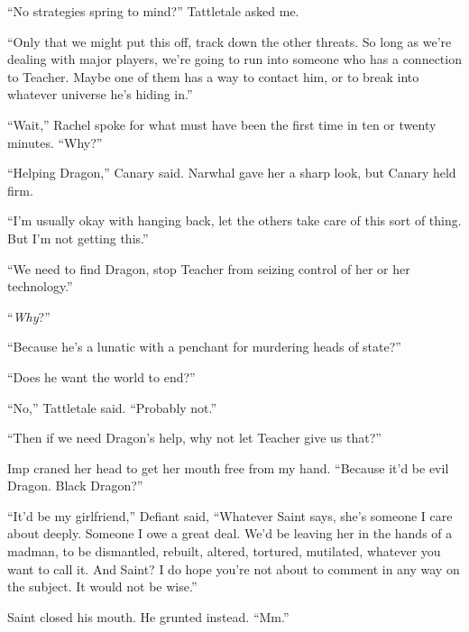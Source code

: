 ``No strategies spring to mind?''  Tattletale asked me.



``Only that we might put this off, track down the other threats.  So long as we're dealing with major players, we're going to run into someone who has a connection to Teacher.  Maybe one of them has a way to contact him, or to break into whatever universe he's hiding in.''



``Wait,'' Rachel spoke for what must have been the first time in ten or twenty minutes.  ``Why?''



``Helping Dragon,'' Canary said.  Narwhal gave her a sharp look, but Canary held firm.



``I'm usually okay with hanging back, let the others take care of this sort of thing.  But I'm not getting this.''



``We need to find Dragon, stop Teacher from seizing control of her or her technology.''



``\emph{Why}?''



``Because he's a lunatic with a penchant for murdering heads of state?''



``Does he want the world to end?''



``No,'' Tattletale said.  ``Probably not.''



``Then if we need Dragon's help, why not let Teacher give us that?''



Imp craned her head to get her mouth free from my hand.  ``Because it'd be evil Dragon.  Black Dragon?''



``It'd be my girlfriend,'' Defiant said, ``Whatever Saint says, she's someone I care about deeply.  Someone I owe a great deal.  We'd be leaving her in the hands of a madman, to be dismantled, rebuilt, altered, tortured, mutilated, whatever you want to call it.  And Saint?  I do hope you're not about to comment in any way on the subject.  It would not be wise.''



Saint closed his mouth.  He grunted instead.  ``Mm.''



